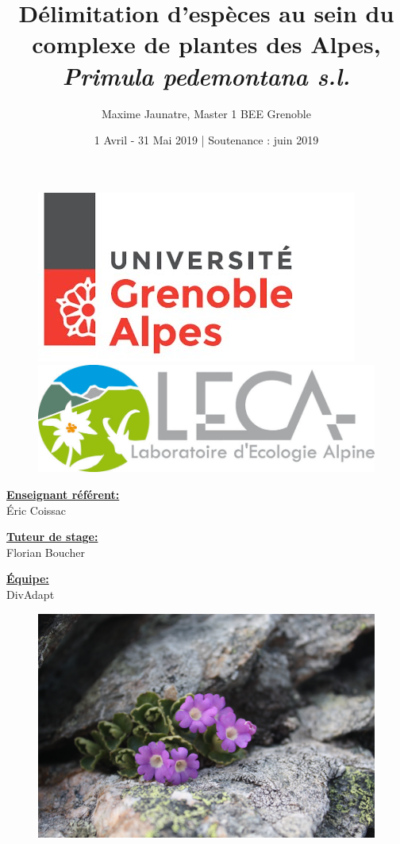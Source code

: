 \documentclass[12pt,a4paper,notitlepage,colorinlistoftodos]{article}
\title{\textbf{Délimitation d'espèces au sein du complexe de plantes des Alpes, \textit{Primula pedemontana s.l.}}}
\author{Maxime Jaunatre, Master 1 BEE Grenoble}
\date{1 Avril - 31 Mai 2019  |  Soutenance : juin 2019 }
\begin{document}
\begin{titlepage} %
\begin{figure}
\noindent
\begin{minipage}{0.5\textwidth}
\centering
\includegraphics[width=0.5\linewidth,left]{fig/UGA.jpg}
\end{minipage}
\begin{minipage}{0.5\textwidth}
\centering
\includegraphics[width=0.5\linewidth,right]{fig/leca.jpg}
\end{minipage}
\end{figure}
\maketitle

\noindent
\begin{minipage}{1.3in}
\textbf{\underline{Enseignant référent:}} \\
Éric Coissac
\end{minipage}
\hfill
\begin{minipage}{1.3in}
\textbf{\underline{Tuteur de stage:}} \\
Florian Boucher
\end{minipage}
\hfill
\begin{minipage}{1.3in}
\textbf{\underline{Équipe:}} \\
DivAdapt
\end{minipage}

\begin{figure}[h]
\begin{center}
\includegraphics[scale=0.1]{fig/Primula_hirsuta_Grand_Chat_longistyle.JPG}
\end{center}
\end{figure}
\thispagestyle{empty}


\end{titlepage}
\end{document}

